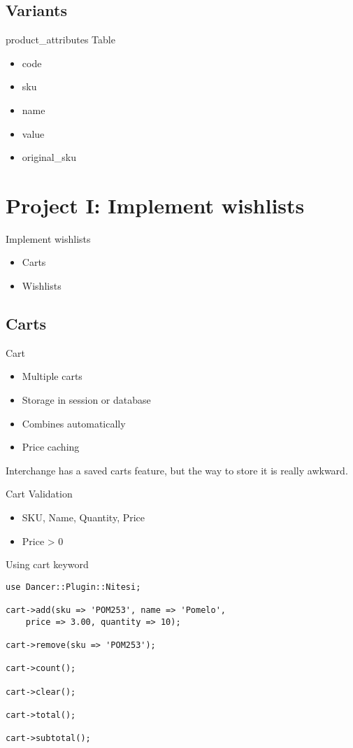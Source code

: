 \subsection{Variants}
\begin{frame}[fragile]{product\_attributes Table}
\begin{itemize}
\item code
\item sku
\item name
\item value
\item original\_sku
\end{itemize}
\end{frame}

\section{Project I: Implement wishlists}
\begin{frame}{Implement wishlists}
\begin{itemize}
\item Carts
\item Wishlists
\end{itemize}
\end{frame}

\subsection{Carts}
\begin{frame}{Cart}
\begin{itemize}
\item Multiple carts
\item Storage in session or database
\item Combines automatically
\item Price caching
\end{itemize}
\end{frame}

Interchange has a saved carts feature, but the way to store it is
really awkward.

\begin{frame}{Cart Validation}
\begin{itemize}
\item SKU, Name, Quantity, Price
\item Price > 0
\end{itemize}
\end{frame}

\begin{frame}[fragile]{Using cart keyword}
\begin{lstlisting}
use Dancer::Plugin::Nitesi;

cart->add(sku => 'POM253', name => 'Pomelo',
    price => 3.00, quantity => 10);

cart->remove(sku => 'POM253');

cart->count();

cart->clear();

cart->total();

cart->subtotal();
\end{lstlisting}
\end{frame}

